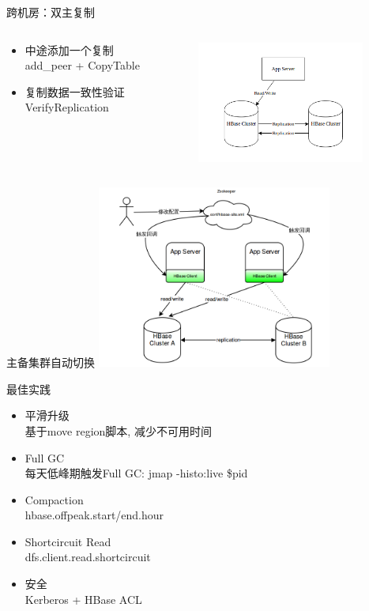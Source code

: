 \documentclass[xcolor=table]{beamer}
\begin{document}
\begin{CJK}{UTF8}{gkai}
\begin{frame}{\subsecname}
	跨机房：双主复制 \\
	\begin{columns}
	\begin{column}{0.5\textwidth}
		\begin{itemize}
			\item 中途添加一个复制 \\
				\small add\_peer + CopyTable
	  	\item 复制数据一致性验证 \\
				\small VerifyReplication
		\end{itemize}
	\end{column}
	\begin{column}{0.5\textwidth}
	\includegraphics[width=\textwidth, height=4cm]{master-master.png}
	\end{column}
\end{columns}
\end{frame}

\begin{frame}{\subsecname}
	主备集群自动切换
	\includegraphics[width=\textwidth, height=6cm]{cluster-switch.png}
\end{frame}

\begin{frame}{最佳实践}
\begin{itemize}
\item 平滑升级 \\
	\small 基于move region脚本, 减少不可用时间
\item Full GC \\
	\small 每天低峰期触发Full GC: jmap -histo:live \$pid
\item Compaction \\
	\small hbase.offpeak.start/end.hour
\item Shortcircuit Read \\
	\small dfs.client.read.shortcircuit
\item 安全 \\ 
	\small Kerberos + HBase ACL
\end{itemize}
\end{frame}


\end{CJK}
\end{document}
